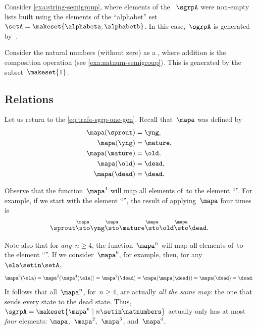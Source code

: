 \begin{example}
    Consider \cref{exa:string-semigroup}, where elements of the ~$\sgrpA$ were non-empty lists built using the elements of the ``alphabet'' set~$\setA = \makeset{ \alphabeta, \alphabetb}$.
    In this case,~$\sgrpA$ is generated by~\setA.
\end{example}

\begin{example}
    Consider the natural numbers (without zero) as a , where addition is the  composition operation (see \cref{exa:natnum-semigroup}).
    This  is generated by the subset~$\makeset{1 }$.
\end{example}

\subsection{Relations}

Let us return to the  \cref{eq:trafo-sgrp-one-gen}.
Recall that~$\mapa$ was defined by
%
\begin{align}
    \mapa(\sprout) & = \yng, \\
    \mapa(\yng)    & = \mature, \\
    \mapa(\mature) & = \old, \\
    \mapa( \old)   & = \dead, \\
    \mapa(\dead)   & = \dead.
\end{align}

Observe that the function~$\mapa^4$ will map all elements of~\setA to the element ``\dead''.
For example, if we start with the element ``\sprout'', the result of applying~$\mapa$ four times is
%
\begin{equation}
    \sprout \overset{\mapa}{\sto} \yng \overset{\mapa}{\sto} \mature \overset{\mapa}{\sto} \old \overset{\mapa}{\sto} \dead.
\end{equation}

Note also that for \emph{any}~$n \geq 4$, the function~$\mapa^n$ will map all elements of~\setA to the element ``\dead''.
If we consider~$\mapa^6$, for example, then, for any~$\ela \setin \setA$,
%
\begin{equation}
    \mapa^6(\ela) = \mapa^2(\mapa^4(\ela)) = \mapa^2(\dead) = \mapa(\mapa(\dead)) = \mapa(\dead) = \dead.
\end{equation}
%
It follows that all~$\mapa^n$, for~$n \geq 4$, are actually \emph{all the same map}: the one that sends every state to the dead state.
Thus, ~$\sgrpA = \makeset{ \mapa^n \mid n \setin \natnumbers }$ actually only has at most \emph{four} elements: $\mapa$,~$\mapa^2$,~$\mapa^3$, and~$\mapa^4$.

